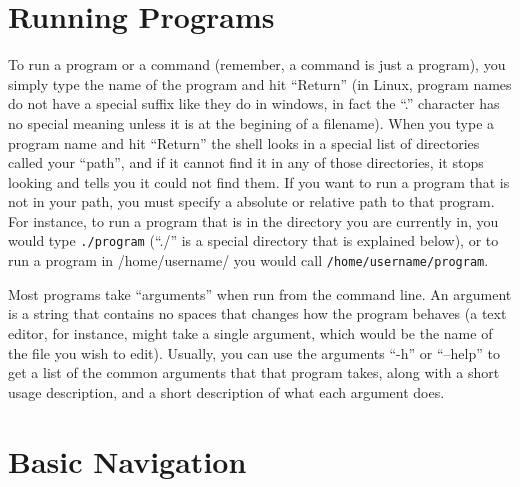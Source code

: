 \documentclass[12pt,letterpaper,oneside, openany]{book} \usepackage[latin1] {inputenc}
\begin{document}
\section{Running Programs}

To run a program or a command (remember, a command is just a program), you simply type the name of the program and hit ``Return'' (in Linux, program names do not have a special suffix like they do in windows, in fact the ``.'' character has no special meaning unless it is at the begining of a filename).  When you type a program name and hit ``Return'' the shell looks in a special list of directories called your ``path'', and if it cannot find it in any of those directories, it stops looking and tells you it could not find them.  If you want to run a program that is not in your path, you must specify a absolute or relative path to that program.  For instance, to run a program that is in the directory you are currently in, you would type \verb+./program+ (``./'' is a special directory that is explained below), or to run a program in /home/username/ you would call \verb+/home/username/program+.

Most programs take ``arguments'' when run from the command line.  An argument is a string that contains no spaces that changes how the program behaves (a text editor, for instance, might take a single argument, which would be the name of the file you wish to edit).  Usually, you can use the arguments ``-h'' or ``--help'' to get a list of the common arguments that that program takes, along with a short usage description, and a short description of what each argument does.

\section{Basic Navigation}
\end{document}
